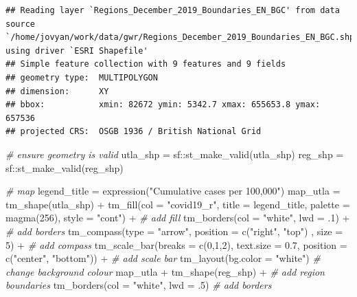 \documentclass[
]{book}
\newenvironment{Shaded}{\begin{snugshade}}{\end{snugshade}}
\newcommand{\AttributeTok}[1]{\textcolor[rgb]{0.77,0.63,0.00}{#1}}
\newcommand{\CommentTok}[1]{\textcolor[rgb]{0.56,0.35,0.01}{\textit{#1}}}
\newcommand{\DecValTok}[1]{\textcolor[rgb]{0.00,0.00,0.81}{#1}}
\newcommand{\FloatTok}[1]{\textcolor[rgb]{0.00,0.00,0.81}{#1}}
\newcommand{\FunctionTok}[1]{\textcolor[rgb]{0.00,0.00,0.00}{#1}}
\newcommand{\NormalTok}[1]{#1}
\newcommand{\OtherTok}[1]{\textcolor[rgb]{0.56,0.35,0.01}{#1}}
\newcommand{\SpecialCharTok}[1]{\textcolor[rgb]{0.00,0.00,0.00}{#1}}
\newcommand{\StringTok}[1]{\textcolor[rgb]{0.31,0.60,0.02}{#1}}
\begin{document}
\begin{verbatim}
## Reading layer `Regions_December_2019_Boundaries_EN_BGC' from data source `/home/jovyan/work/data/gwr/Regions_December_2019_Boundaries_EN_BGC.shp' using driver `ESRI Shapefile'
## Simple feature collection with 9 features and 9 fields
## geometry type:  MULTIPOLYGON
## dimension:      XY
## bbox:           xmin: 82672 ymin: 5342.7 xmax: 655653.8 ymax: 657536
## projected CRS:  OSGB 1936 / British National Grid
\end{verbatim}

\begin{Shaded}
\begin{Highlighting}[]
\CommentTok{\# ensure geometry is valid}
\NormalTok{utla\_shp }\OtherTok{=}\NormalTok{ sf}\SpecialCharTok{::}\FunctionTok{st\_make\_valid}\NormalTok{(utla\_shp)}
\NormalTok{reg\_shp }\OtherTok{=}\NormalTok{ sf}\SpecialCharTok{::}\FunctionTok{st\_make\_valid}\NormalTok{(reg\_shp)}

\CommentTok{\# map}
\NormalTok{legend\_title }\OtherTok{=} \FunctionTok{expression}\NormalTok{(}\StringTok{"Cumulative cases per 100,000"}\NormalTok{)}
\NormalTok{map\_utla }\OtherTok{=} \FunctionTok{tm\_shape}\NormalTok{(utla\_shp) }\SpecialCharTok{+}
  \FunctionTok{tm\_fill}\NormalTok{(}\AttributeTok{col =} \StringTok{"covid19\_r"}\NormalTok{, }\AttributeTok{title =}\NormalTok{ legend\_title, }\AttributeTok{palette =} \FunctionTok{magma}\NormalTok{(}\DecValTok{256}\NormalTok{), }\AttributeTok{style =} \StringTok{"cont"}\NormalTok{) }\SpecialCharTok{+} \CommentTok{\# add fill}
  \FunctionTok{tm\_borders}\NormalTok{(}\AttributeTok{col =} \StringTok{"white"}\NormalTok{, }\AttributeTok{lwd =}\NormalTok{ .}\DecValTok{1}\NormalTok{)  }\SpecialCharTok{+} \CommentTok{\# add borders}
  \FunctionTok{tm\_compass}\NormalTok{(}\AttributeTok{type =} \StringTok{"arrow"}\NormalTok{, }\AttributeTok{position =} \FunctionTok{c}\NormalTok{(}\StringTok{"right"}\NormalTok{, }\StringTok{"top"}\NormalTok{) , }\AttributeTok{size =} \DecValTok{5}\NormalTok{) }\SpecialCharTok{+} \CommentTok{\# add compass}
  \FunctionTok{tm\_scale\_bar}\NormalTok{(}\AttributeTok{breaks =} \FunctionTok{c}\NormalTok{(}\DecValTok{0}\NormalTok{,}\DecValTok{1}\NormalTok{,}\DecValTok{2}\NormalTok{), }\AttributeTok{text.size =} \FloatTok{0.7}\NormalTok{, }\AttributeTok{position =}  \FunctionTok{c}\NormalTok{(}\StringTok{"center"}\NormalTok{, }\StringTok{"bottom"}\NormalTok{)) }\SpecialCharTok{+} \CommentTok{\# add scale bar}
  \FunctionTok{tm\_layout}\NormalTok{(}\AttributeTok{bg.color =} \StringTok{"white"}\NormalTok{) }\CommentTok{\# change background colour}
\NormalTok{map\_utla }\SpecialCharTok{+} \FunctionTok{tm\_shape}\NormalTok{(reg\_shp) }\SpecialCharTok{+} \CommentTok{\# add region boundaries}
  \FunctionTok{tm\_borders}\NormalTok{(}\AttributeTok{col =} \StringTok{"white"}\NormalTok{, }\AttributeTok{lwd =}\NormalTok{ .}\DecValTok{5}\NormalTok{) }\CommentTok{\# add borders}
\end{Highlighting}
\end{Shaded}
\end{document}
